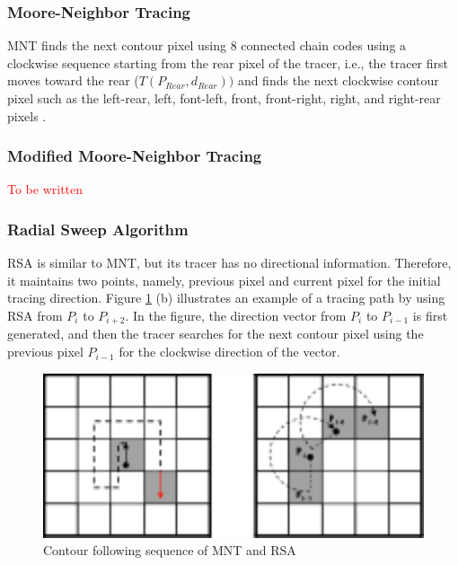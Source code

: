 \subsubsection{Moore-Neighbor Tracing}
MNT finds the next contour pixel using 8 connected chain codes using a clockwise sequence starting from the rear pixel of the tracer, i.e., the tracer first moves toward the rear ($T (P_{Rear}, d_{Rear}))$ and finds the next clockwise contour pixel such as the left-rear, left, font-left, front, front-right, right, and right-rear pixels \cite{Toussaint????Grids}. 

\subsubsection{Modified Moore-Neighbor Tracing}
\textcolor{red}{To be written}

\subsubsection{Radial Sweep Algorithm}
RSA \cite{Mirante1982Radial} is similar to MNT, but its tracer has no directional information. Therefore, it maintains two points, namely, previous pixel and current pixel for the initial tracing direction. Figure \ref{fig:mnt_rsa} (b) illustrates an example of a tracing path by using RSA from $P_i$ to $P_{i+2}$. In the figure, the direction vector from $P_i$ to $P_{i-1}$ is first generated, and then the tracer searches for the next contour pixel using the previous pixel $P_{i-1}$ for the clockwise direction of the vector.
\begin{figure}[htbp]
	\centering
	\includegraphics[width=1.0\textwidth]{2.RelatedWorks/rsa.png}
	\caption{Contour following sequence of MNT and RSA}
	\label{fig:mnt_rsa}
\end{figure}

